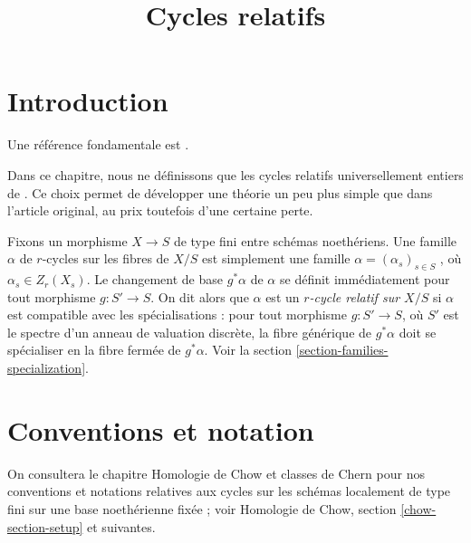  

%
 

\title{Cycles relatifs} 


\maketitle

\label{section-phantom} 

\tableofcontents



\section{Introduction} 
\label{section-introduction} 

\noindent
 Une référence fondamentale est \cite{SV}. 

\medskip\noindent
 Dans ce chapitre, nous ne définissons que les cycles relatifs universellement
 entiers de \cite{SV}. Ce choix permet de développer une théorie 
un peu plus simple que dans l'article original, au prix toutefois d'une certaine perte. 

\medskip\noindent
 Fixons un morphisme $X \to S$ de type fini 
entre schémas noethériens. Une famille $\alpha$ de $r$-cycles sur les fibres
 de $X/S$ est simplement une famille $\alpha = (\alpha_s)_{s \in S}$
 , où $\alpha_s \in Z_r(X_s)$. Le changement 
de base $g^*\alpha$ de $\alpha$ se définit immédiatement pour tout morphisme $g : S' \to S$.
 On dit alors que $\alpha$ est un {\it $r$-cycle relatif sur $X/S$}
 si $\alpha$ est compatible avec les spécialisations : pour tout 
morphisme $g : S' \to S$, où $S'$ est le spectre d'un anneau 
de valuation discrète, la fibre générique de $g^*\alpha$
 doit se spécialiser en la fibre fermée de $g^*\alpha$.
 Voir la section \ref{section-families-specialization}. 






\section{Conventions et notation} 
\label{section-conventions} 

\noindent
 On consultera le chapitre Homologie de Chow et classes de Chern pour
 nos conventions et notations relatives aux cycles sur les schémas 
localement de type fini sur une base noethérienne fixée ; voir 
Homologie de Chow, section \ref{chow-section-setup} et suivantes. 

